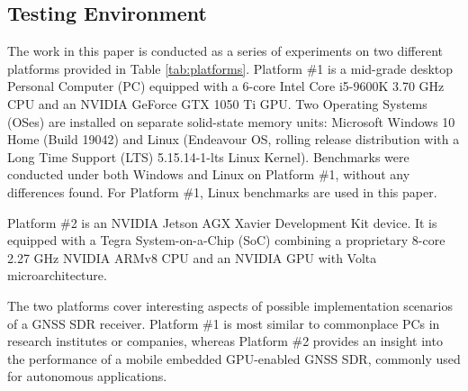 \documentclass{juliacon}
\begin{document}
\subsection*{Testing Environment}
The work in this paper is conducted as a series of experiments on two different platforms provided in Table \ref{tab:platforms}. Platform \#1 is a mid-grade desktop Personal Computer (PC) equipped with a 6-core Intel Core i5-9600K 3.70 GHz CPU and an NVIDIA GeForce GTX 1050 Ti GPU. Two Operating Systems (OSes) are installed on separate solid-state memory units: Microsoft Windows 10 Home (Build 19042) and Linux (Endeavour OS, rolling release distribution with a Long Time Support (LTS) 5.15.14-1-lts Linux Kernel). Benchmarks were conducted under both Windows and Linux on Platform \#1, without any differences found. For Platform \#1, Linux benchmarks are used in this paper.

Platform \#2 is an NVIDIA Jetson AGX Xavier Development Kit device. It is equipped with a Tegra System-on-a-Chip (SoC) combining a proprietary 8-core 2.27 GHz NVIDIA ARMv8 CPU and an NVIDIA GPU with Volta microarchitecture. 

The two platforms cover interesting aspects of possible implementation scenarios of a GNSS SDR receiver. Platform \#1 is most similar to commonplace PCs in research institutes or companies, whereas Platform \#2 provides an insight into the performance of a mobile embedded GPU-enabled GNSS SDR, commonly used for autonomous applications.
\end{document}
